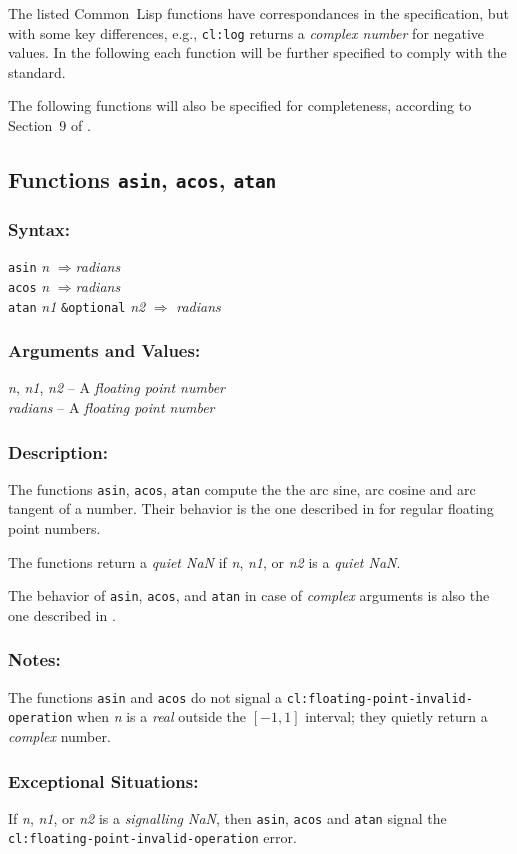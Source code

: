\documentclass[10pt,fleqn]{article}
\newcommand{\CL}{\textsf{Common~Lisp}}
\newcommand{\code}[1]{\texttt{#1}}
\newcommand{\clieeeterm}[1]{\textit{#1}}
\newcommand{\varname}[1]{\textit{#1}}
\newcommand{\clterm}[1]{\textit{#1}}
\newcommand{\clname}[1]{\texttt{#1}}
\newcommand{\RArrow}{$\Rightarrow$}
\newcommand{\DDictionaryItem}[1]{\vspace*{6pt}\noindent\hrulefill\vspace*{-9pt}\subsection*{#1}}
\newcommand{\DSyntax}{\subsubsection*{Syntax:}}
\newcommand{\DArgsNValues}{\subsubsection*{Arguments and Values:}}
\newcommand{\DDescription}{\subsubsection*{Description:}}
\newcommand{\DExceptional}{\subsubsection*{Exceptional Situations:}}
\newcommand{\DNotes}{\subsubsection*{Notes:}}
\begin{document}
\noindent
The listed \CL{} functions have correspondances in the \cite{2008:IEEE-754}
specification, but with some key differences, e.g., \code{cl:log} returns
a \clterm{complex number} for negative values.  In the following each
function will be further specified to comply with the \cite{2008:IEEE-754}
standard.

\vspace*{3mm}

The following functions will also be specified for completeness,
according to Section~9 of \cite{2008:IEEE-754}.


\DDictionaryItem{Functions \code{asin}, \code{acos}, \code{atan}}
\index{A!\code{asin}}
\index{A!\code{acos}}
\index{A!\code{atan}}

\DSyntax{}

\code{asin} \varname{n} \RArrow \varname{radians}\\
\code{acos} \varname{n} \RArrow \varname{radians}\\
\code{atan} \varname{n1} \code{\&optional} \varname{n2} \RArrow
\varname{radians}

\DArgsNValues{}

\varname{n}, \varname{n1}, \varname{n2} -- A \clieeeterm{floating
  point number}\\
\varname{radians} -- A \clieeeterm{floating point number}

\DDescription{}

The functions \code{asin}, \code{acos}, \code{atan} compute the the
arc sine, arc cosine and arc tangent of a number.  Their behavior is
the one described in \cite{1996:ANSIHyperSpec} for regular floating point
numbers.

The functions return a \clieeeterm{quiet NaN} if \varname{n},
\varname{n1}, or \varname{n2} is a \clieeeterm{quiet NaN}.

The behavior of \code{asin}, \code{acos}, and \code{atan} in case of
\clterm{complex} arguments is also the one described in
\cite{1996:ANSIHyperSpec}.

\DNotes{}

The functions \code{asin} and \code{acos} do not signal a
\code{cl:floating-point-invalid-operation} when \varname{n} is a
\clterm{real} outside the $[-1, 1]$ interval; they quietly return a
\clterm{complex} number.

\DExceptional{}

If \varname{n}, \varname{n1}, or \varname{n2} is a
\clieeeterm{signalling NaN}, then \code{asin}, \code{acos} and
\code{atan} signal the\\
\clname{cl:floating-point-invalid-operation} error.
\end{document}
